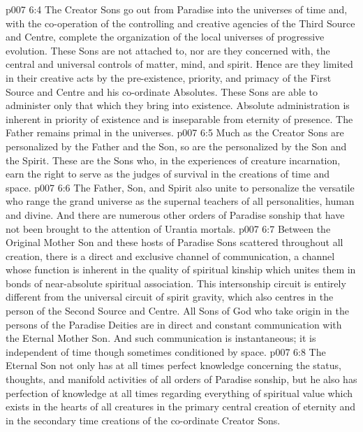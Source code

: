 \vs p007 6:4 The Creator Sons go out from Paradise into the universes of time and, with the co\hyp{}operation of the controlling and creative agencies of the Third Source and Centre, complete the organization of the local universes of progressive evolution. These Sons are not attached to, nor are they concerned with, the central and universal controls of matter, mind, and spirit. Hence are they limited in their creative acts by the pre\hyp{}existence, priority, and primacy of the First Source and Centre and his co\hyp{}ordinate Absolutes. These Sons are able to administer only that which they bring into existence. Absolute administration is inherent in priority of existence and is inseparable from eternity of presence. The Father remains primal in the universes.
\vs p007 6:5 \pc Much as the Creator Sons are personalized by the Father and the Son, so are the  personalized by the Son and the Spirit. These are the Sons who, in the experiences of creature incarnation, earn the right to serve as the judges of survival in the creations of time and space.
\vs p007 6:6 \pc The Father, Son, and Spirit also unite to personalize the versatile  who range the grand universe as the supernal teachers of all personalities, human and divine. And there are numerous other orders of Paradise sonship that have not been brought to the attention of Urantia mortals.
\vs p007 6:7 \pc Between the Original Mother Son and these hosts of Paradise Sons scattered throughout all creation, there is a direct and exclusive channel of communication, a channel whose function is inherent in the quality of spiritual kinship which unites them in bonds of near\hyp{}absolute spiritual association. This intersonship circuit is entirely different from the universal circuit of spirit gravity, which also centres in the person of the Second Source and Centre. All Sons of God who take origin in the persons of the Paradise Deities are in direct and constant communication with the Eternal Mother Son. And such communication is instantaneous; it is independent of time though sometimes conditioned by space.
\vs p007 6:8 The Eternal Son not only has at all times perfect knowledge concerning the status, thoughts, and manifold activities of all orders of Paradise sonship, but he also has perfection of knowledge at all times regarding everything of spiritual value which exists in the hearts of all creatures in the primary central creation of eternity and in the secondary time creations of the co\hyp{}ordinate Creator Sons.
